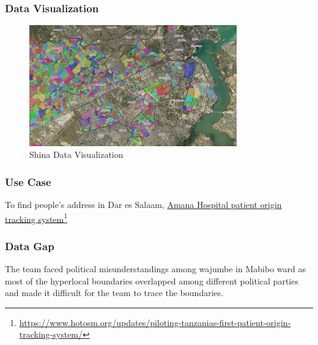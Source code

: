 \documentclass[a4paper,12pt,twoside]{article}
\begin{document}
\subsubsection{Data Visualization}
\begin{figure}[h]
  \color{RHgreen}\caption{Shina Data Visualization}
  \centering
 \includegraphics[width=0.8\textwidth]{images/Shinas_Data_Viz.png}
\end{figure}

\subsubsection{Use Case}
To find people’s address in Dar es Salaam, \href{https://www.hotosm.org/updates/piloting-tanzanias-first-patient-origin-tracking-system/}{Amana Hospital patient origin tracking system}\footnote{\url{https://www.hotosm.org/updates/piloting-tanzanias-first-patient-origin-tracking-system/}}

\subsubsection{Data Gap}
The team faced political misunderstandings among wajumbe in Mabibo ward as most of the hyperlocal boundaries overlapped among different political parties and made it difficult for the team to trace the boundaries.
\end{document}
